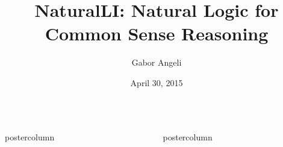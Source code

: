 \documentclass[final]{beamer} %
\title[NaturalLI]{NaturalLI: Natural Logic for \\ Common Sense Reasoning}
\author[Gabor Angeli]{Gabor Angeli}
\institute[Stanford]{Stanford Natural Language Processing}
\date{April 30, 2015}
\newlength{\columnheight}
\begin{document}
\begin{frame}{} 
\begin{columns}

\begin{column}{.49\textwidth}
  \begin{beamercolorbox}[center,wd=\textwidth]{postercolumn}
    \begin{minipage}[T]{.95\textwidth}  %
      \parbox[t][\columnheight]{\textwidth}{%
        
        
      }
    \end{minipage}
  \end{beamercolorbox}
\end{column}

\begin{column}{.49\textwidth}
  \begin{beamercolorbox}[center,wd=\textwidth]{postercolumn}
    \begin{minipage}[T]{.95\textwidth}  %
      \parbox[t][\columnheight]{\textwidth}{%
        
        
      }
    \end{minipage}
  \end{beamercolorbox}
\end{column}

\end{columns}
\end{frame}
\end{document}

